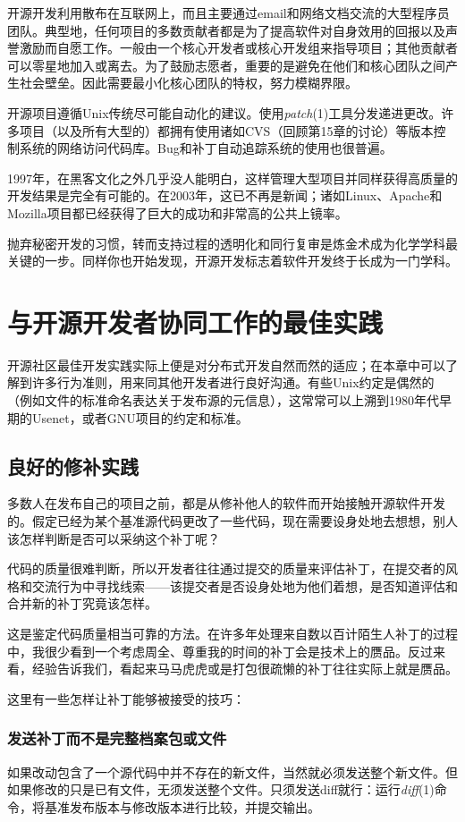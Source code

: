 \documentclass[12pt,oneside]{book}
\begin{document}
开源开发利用散布在互联网上，而且主要通过email和网络文档交流的大型程序员团队。典型地，任何项目的多数贡献者都是为了提高软件对自身效用的回报以及声誉激励而自愿工作。一般由一个核心开发者或核心开发组来指导项目；其他贡献者可以零星地加入或离去。为了鼓励志愿者，重要的是避免在他们和核心团队之间产生社会壁垒。因此需要最小化核心团队的特权，努力模糊界限。

开源项目遵循Unix传统尽可能自动化的建议。使用\textit{patch}(1)工具分发递进更改。许多项目（以及所有大型的）都拥有使用诸如CVS（回顾第15章的讨论）等版本控制系统的网络访问代码库。Bug和补丁自动追踪系统的使用也很普遍。

1997年，在黑客文化之外几乎没人能明白，这样管理大型项目并同样获得高质量的开发结果是完全有可能的。在2003年，这已不再是新闻；诸如Linux、Apache和Mozilla项目都已经获得了巨大的成功和非常高的公共上镜率。

抛弃秘密开发的习惯，转而支持过程的透明化和同行复审是炼金术成为化学学科最关键的一步。同样你也开始发现，开源开发标志着软件开发终于长成为一门学科。

\section{与开源开发者协同工作的最佳实践}
开源社区最佳开发实践实际上便是对分布式开发自然而然的适应；在本章中可以了解到许多行为准则，用来同其他开发者进行良好沟通。有些Unix约定是偶然的（例如文件的标准命名表达关于发布源的元信息），这常常可以上溯到1980年代早期的Usenet，或者GNU项目的约定和标准。

\subsection{良好的修补实践}
多数人在发布自己的项目之前，都是从修补他人的软件而开始接触开源软件开发的。假定已经为某个基准源代码更改了一些代码，现在需要设身处地去想想，别人该怎样判断是否可以采纳这个补丁呢？

代码的质量很难判断，所以开发者往往通过提交的质量来评估补丁，在提交者的风格和交流行为中寻找线索——该提交者是否设身处地为他们着想，是否知道评估和合并新的补丁究竟该怎样。

这是鉴定代码质量相当可靠的方法。在许多年处理来自数以百计陌生人补丁的过程中，我很少看到一个考虑周全、尊重我的时间的补丁会是技术上的赝品。反过来看，经验告诉我们，看起来马马虎虎或是打包很疏懒的补丁往往实际上就是赝品。

这里有一些怎样让补丁能够被接受的技巧：

\subsubsection{发送补丁而不是完整档案包或文件}
如果改动包含了一个源代码中并不存在的新文件，当然就必须发送整个新文件。但如果修改的只是已有文件，无须发送整个文件。只须发送diff就行：运行\textit{diff}(1)命令，将基准发布版本与修改版本进行比较，并提交输出。
\end{document}
